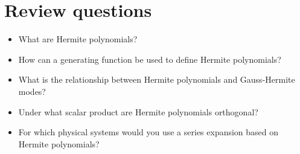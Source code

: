 \section*{Review questions}

\begin{itemize}
\item What are Hermite polynomials?  
\item How can a generating function be used to define Hermite polynomials?
\item What is the relationship between Hermite polynomials and Gauss-Hermite modes?  
\item Under what scalar product are Hermite polynomials orthogonal?
\item For which physical systems would you use a series expansion based on Hermite polynomials?  
\end{itemize}



